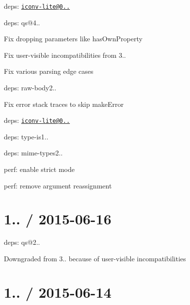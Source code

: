 \begin{DoxyItemize}
\item deps\+: \href{mailto:iconv-lite@0.4.11}{\tt iconv-\/lite@0..}
\item deps\+: qs@4..
\begin{DoxyItemize}
\item Fix dropping parameters like {\ttfamily has\+Own\+Property}
\item Fix user-\/visible incompatibilities from 3..
\item Fix various parsing edge cases
\end{DoxyItemize}
\item deps\+: raw-\/body2..
\begin{DoxyItemize}
\item Fix error stack traces to skip {\ttfamily make\+Error}
\item deps\+: \href{mailto:iconv-lite@0.4.11}{\tt iconv-\/lite@0..}
\end{DoxyItemize}
\item deps\+: type-\/is1..
\begin{DoxyItemize}
\item deps\+: mime-\/types2..
\item perf\+: enable strict mode
\item perf\+: remove argument reassignment
\end{DoxyItemize}
\end{DoxyItemize}

\section*{1.. / 2015-\/06-\/16 }


\begin{DoxyItemize}
\item deps\+: qs@2..
\begin{DoxyItemize}
\item Downgraded from 3.. because of user-\/visible incompatibilities
\end{DoxyItemize}
\end{DoxyItemize}

\section*{1.. / 2015-\/06-\/14 }


